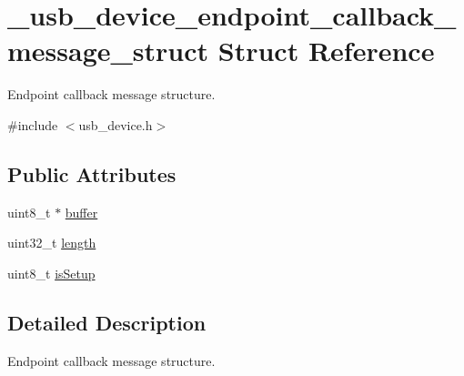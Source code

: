 \hypertarget{struct__usb__device__endpoint__callback__message__struct}{\section{\-\_\-usb\-\_\-device\-\_\-endpoint\-\_\-callback\-\_\-message\-\_\-struct Struct Reference}
\label{struct__usb__device__endpoint__callback__message__struct}
}


Endpoint callback message structure.  




{\ttfamily \#include $<$usb\-\_\-device.\-h$>$}

\subsection*{Public Attributes}
\begin{DoxyCompactItemize}
\item 
uint8\-\_\-t $\ast$ \hyperlink{struct__usb__device__endpoint__callback__message__struct_ad183f5b363378846e13033bafbfc9398}{buffer}
\item 
uint32\-\_\-t \hyperlink{struct__usb__device__endpoint__callback__message__struct_a3ec34e2b26c6eb038d43b11ecc945c07}{length}
\item 
uint8\-\_\-t \hyperlink{struct__usb__device__endpoint__callback__message__struct_a72f4d74684d9baa0a3b8b5b29119cd28}{is\-Setup}
\end{DoxyCompactItemize}


\subsection{Detailed Description}
Endpoint callback message structure. 

